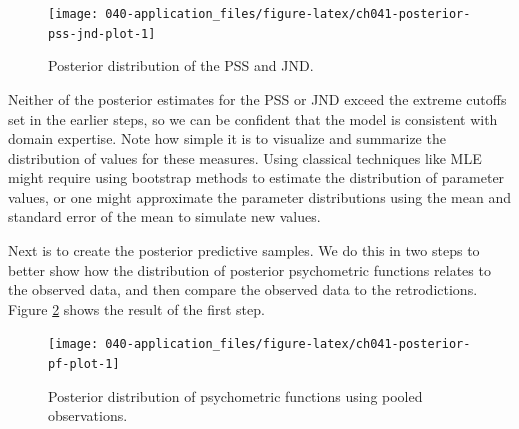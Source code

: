 \documentclass[11pt, oneside, openany]{scrbook}
\newenvironment{Shaded}{\begin{snugshade}}{\end{snugshade}}
\newcommand{\FloatTok}[1]{\textcolor[rgb]{0.00,0.00,0.81}{#1}}
\newcommand{\KeywordTok}[1]{\textcolor[rgb]{0.13,0.29,0.53}{\textbf{#1}}}
\newcommand{\NormalTok}[1]{#1}
\newcommand{\OperatorTok}[1]{\textcolor[rgb]{0.81,0.36,0.00}{\textbf{#1}}}
\newcommand{\StringTok}[1]{\textcolor[rgb]{0.31,0.60,0.02}{#1}}
\begin{document}

\begin{Shaded}
\end{Shaded}


\begin{figure}

{\centering \texttt{[image: 040-application\_files/figure-latex/ch041-posterior-pss-jnd-plot-1]} 

}

\caption{Posterior distribution of the PSS and JND.}\label{fig:ch041-posterior-pss-jnd-plot}
\end{figure}

Neither of the posterior estimates for the PSS or JND exceed the extreme cutoffs set in the earlier steps, so we can be confident that the model is consistent with domain expertise. Note how simple it is to visualize and summarize the distribution of values for these measures. Using classical techniques like MLE might require using bootstrap methods to estimate the distribution of parameter values, or one might approximate the parameter distributions using the mean and standard error of the mean to simulate new values.

Next is to create the posterior predictive samples. We do this in two steps to better show how the distribution of posterior psychometric functions relates to the observed data, and then compare the observed data to the retrodictions. Figure \ref{fig:ch041-posterior-pf-plot} shows the result of the first step.

\begin{figure}

{\centering \texttt{[image: 040-application\_files/figure-latex/ch041-posterior-pf-plot-1]} 

}

\caption{Posterior distribution of psychometric functions using pooled observations.}\label{fig:ch041-posterior-pf-plot}
\end{figure}
\end{document}
